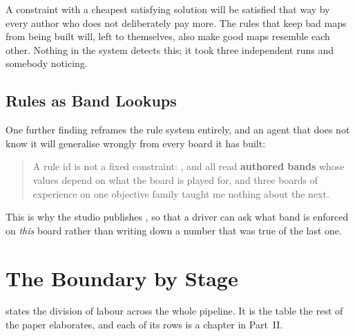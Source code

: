 A constraint with a cheapest satisfying solution will be satisfied that way by
every author who does not deliberately pay more. The rules that keep bad maps from
being built will, left to themselves, also make good maps resemble each other.
Nothing in the system detects this; it took three independent runs and somebody
noticing.

\subsection{Rules as Band Lookups}

One further finding reframes the rule system entirely, and an agent that does not
know it will generalise wrongly from every board it has built:

\begin{quote}
A rule id is not a fixed constraint: ,  and  all read
\textbf{authored bands} whose values depend on what the board is played for, and
three boards of experience on one objective family taught me nothing about the
next.
\end{quote}

This is why the studio publishes , so that a driver
can ask what band is enforced on \emph{this} board rather than writing down a
number that was true of the last one.

\section{The Boundary by Stage}

 states the division of labour across the whole pipeline. It is
the table the rest of the paper elaborates, and each of its rows is a chapter in
Part~II.

